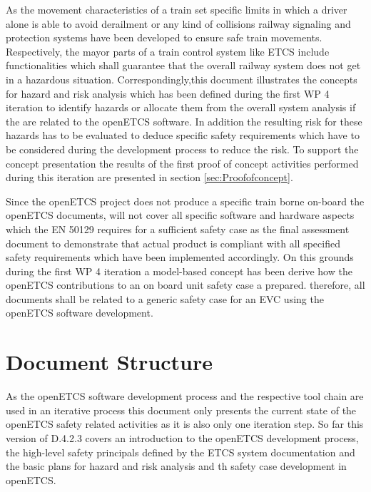 \documentclass{template/openetcs_report}
\begin{document}
As the movement characteristics of a train set specific limits in which a driver alone is able to avoid derailment or any kind of collisions railway signaling and protection systems have been developed to ensure safe train movements. Respectively, the mayor parts of a train control system like ETCS include functionalities which shall guarantee that the overall railway system does not get in a hazardous situation. Correspondingly,this document illustrates the concepts for hazard and risk analysis which has been defined during the first WP 4 iteration to identify hazards or allocate them from the overall system analysis if the are related to the openETCS software. In addition the resulting risk for these hazards has to be evaluated to deduce specific safety requirements which have to be considered during the development process to reduce the risk. To support the concept presentation the results of the first proof of concept activities performed during this iteration are presented in section \ref{sec:Proofofconcept}.

Since the openETCS project does not produce a specific train borne on-board the openETCS documents, will not cover all specific software and hardware aspects which the EN 50129 requires for a sufficient safety case as the final assessment document to demonstrate that actual product is compliant with all specified safety requirements which have been implemented accordingly. On this grounds during the first WP 4 iteration a model-based concept has been derive how the openETCS contributions to an on board unit safety case a prepared. therefore, all documents shall be related to a generic safety case for an EVC using the openETCS software development.

\section{Document Structure}
\label{sec:document-structure}

As the openETCS software development process and the respective tool chain are used in an iterative process this document only presents the current state of the openETCS safety related activities as it is also only one iteration step. So far this version of D.4.2.3 covers an introduction to the openETCS development process, the high-level safety principals defined by the ETCS system documentation and the basic plans for hazard and risk analysis and th safety case development in openETCS. 
\end{document}
